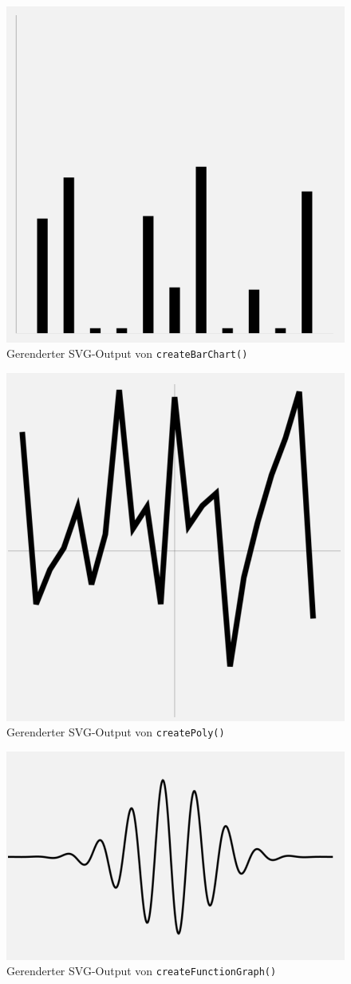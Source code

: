 \documentclass[german,notitlepage,smartquotes]{hgbreport}
\begin{document}
\begin{figure}
\centering
\includegraphics[width=.5\textwidth]{test-02}
\caption{Gerenderter SVG-Output von \texttt{createBarChart()}}
\label{fig:test-02}
\end{figure}

\begin{figure}
\centering
\includegraphics[width=.5\textwidth]{test-03}
\caption{Gerenderter SVG-Output von \texttt{createPoly()}}
\label{fig:test-03}
\end{figure}

\begin{figure}
\centering
\includegraphics[width=.7\textwidth]{test-04}
\caption{Gerenderter SVG-Output von \texttt{createFunctionGraph()}}
\label{fig:test-04}
\end{figure}
\end{document}
